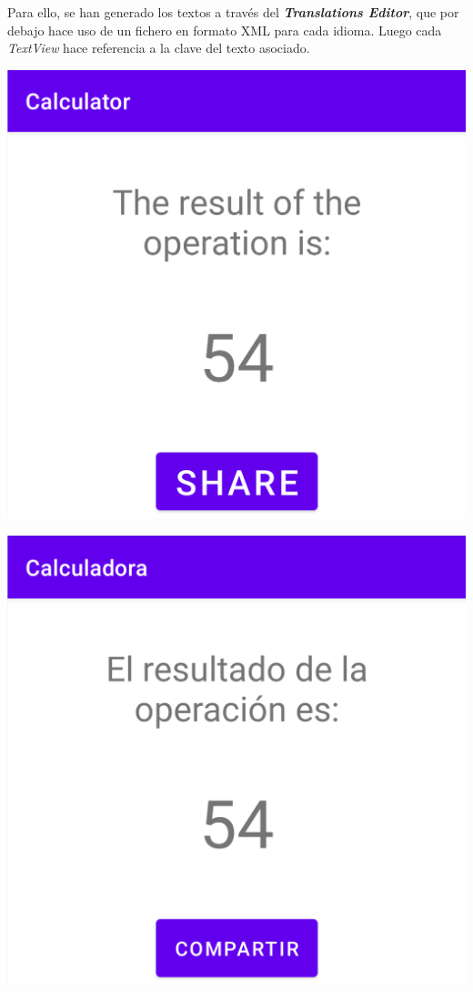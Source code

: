 \documentclass{\ClassPath/viu-tfm-template}
\begin{document}
Para ello, se han generado los textos a través del \textit{\textbf{Translations Editor}}, que por debajo hace uso de un fichero en formato XML para cada idioma. Luego cada \textit{TextView} hace referencia a la clave del texto asociado.

{
\begin{minipage}{0.32\linewidth}
    \includegraphics[frame,width=\linewidth]{img/english.png}
\end{minipage}
\hfill
\begin{minipage}{0.32\linewidth}
    \includegraphics[frame,width=\linewidth]{img/castellano.png}

\end{minipage}}
\end{document}
